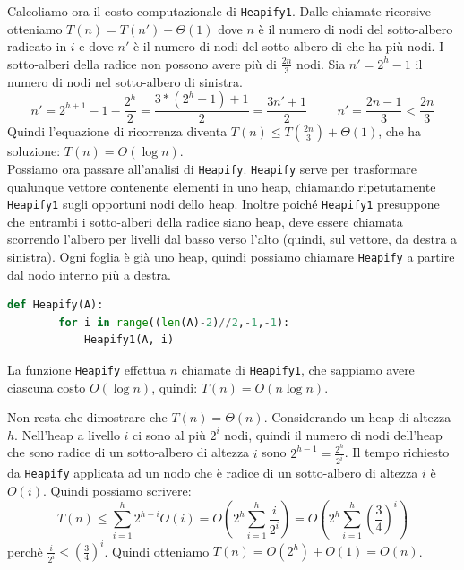 Calcoliamo ora il costo computazionale di \verb|Heapify1|. Dalle chiamate ricorsive otteniamo $T(n) = T(n') + \Theta(1)$ dove $n$ è il numero di nodi del sotto-albero radicato in $i$ e dove $n'$ è il numero di nodi del sotto-albero di che ha più nodi. I sotto-alberi della radice non possono avere più di $\frac{2n}{3}$ nodi. Sia $n' = 2^h-1$ il numero di nodi nel sotto-albero di sinistra.
\begin{equation*}
    n'=2^{h+1}-1-\frac{2^h}{2}=\frac{3*(2^h-1)+1}{2}=\frac{3n'+1}{2}\hspace{1cm}n'=\frac{2n-1}{3}<\frac{2n}{3}
\end{equation*}
Quindi l’equazione di ricorrenza diventa $T(n) \leq T(\frac{2n}{3})+\Theta(1)$, che ha soluzione: $T(n)=O(\log n)$.\\

Possiamo ora passare all'analisi di \verb|Heapify|. \verb|Heapify| serve per trasformare qualunque vettore contenente elementi in uno heap, chiamando ripetutamente \verb|Heapify1| sugli opportuni nodi dello heap. Inoltre poiché \verb|Heapify1| presuppone che entrambi i sotto-alberi della radice siano heap, deve essere chiamata scorrendo l’albero per livelli dal basso verso l’alto (quindi, sul vettore, da destra a sinistra). Ogni foglia è già uno heap, quindi possiamo chiamare \verb|Heapify| a partire dal nodo interno più a destra.

\begin{lstlisting}[language=Python]
    def Heapify(A):
        for i in range((len(A)-2)//2,-1,-1):
            Heapify1(A, i)
\end{lstlisting}

La funzione \verb|Heapify| effettua $n$ chiamate di \verb|Heapify1|, che sappiamo avere ciascuna costo $O(\log n)$, quindi: $T(n)=O(n\log n)$.

Non resta che dimostrare che $T(n)=\Theta(n)$.
Considerando un heap di altezza $h$. Nell'heap a livello $i$ ci sono al più $2^i$ nodi, quindi il numero di nodi dell’heap che sono radice di un sotto-albero di altezza $i$ sono $2^{h-1}=\frac{2^h}{2^i}$. Il tempo richiesto da \verb|Heapify| applicata ad un nodo che è radice di un sotto-albero di altezza $i$ è $O(i)$. Quindi possiamo scrivere:
\begin{equation*}
    T(n)\leq\sum^h_{i=1}2^{h-i}O(i)=O(2^h\sum^h_{i=1}\frac{i}{2^i})=O(2^h\sum^h_{i=1}(\frac{3}{4})^i)
\end{equation*}
perchè $\frac{i}{2^i}<(\frac{3}{4})^i$. Quindi otteniamo $T(n)=O(2^h)+O(1)=O(n)$.

